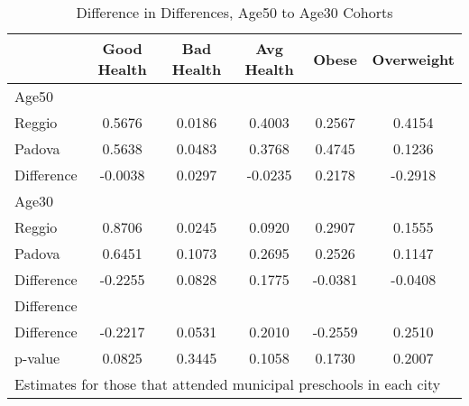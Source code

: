 \begin{table}[htbp]\centering
\caption{Difference in Differences, Age50 to Age30 Cohorts}
\begin{tabular}{l*{5}{c}}
\hline\hline
            & Good Health&  Bad Health&  Avg Health&       Obese&  Overweight\\
\hline
Age50       &            &            &            &            &            \\
Reggio      &      0.5676&      0.0186&      0.4003&      0.2567&      0.4154\\
Padova      &      0.5638&      0.0483&      0.3768&      0.4745&      0.1236\\
Difference  &     -0.0038&      0.0297&     -0.0235&      0.2178&     -0.2918\\
\hline
Age30       &            &            &            &            &            \\
Reggio      &      0.8706&      0.0245&      0.0920&      0.2907&      0.1555\\
Padova      &      0.6451&      0.1073&      0.2695&      0.2526&      0.1147\\
Difference  &     -0.2255&      0.0828&      0.1775&     -0.0381&     -0.0408\\
\hline
Difference  &            &            &            &            &            \\
Difference  &     -0.2217&      0.0531&      0.2010&     -0.2559&      0.2510\\
p-value     &      0.0825&      0.3445&      0.1058&      0.1730&      0.2007\\
\hline\hline
\multicolumn{6}{l}{\footnotesize Estimates for those that attended municipal preschools in each city}\\
\end{tabular}
\end{table}
